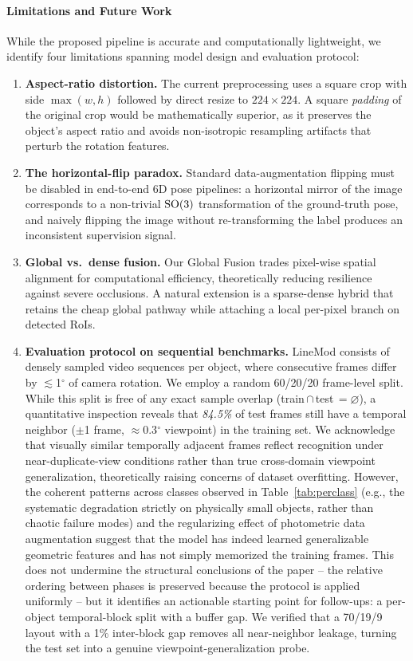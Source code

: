 \paragraph{Limitations and Future Work}
While the proposed pipeline is accurate and computationally lightweight, we identify four limitations spanning model design and evaluation protocol:
\begin{enumerate}
    \item \textbf{Aspect-ratio distortion.} The current preprocessing uses a square crop with side $\max(w,h)$ followed by direct resize to $224{\times}224$. A square \emph{padding} of the original crop would be mathematically superior, as it preserves the object's aspect ratio and avoids non-isotropic resampling artifacts that perturb the rotation features.
    \item \textbf{The horizontal-flip paradox.} Standard data-augmentation flipping must be disabled in end-to-end 6D pose pipelines: a horizontal mirror of the image corresponds to a non-trivial $\mathrm{SO}(3)$ transformation of the ground-truth pose, and naively flipping the image without re-transforming the label produces an inconsistent supervision signal.
    \item \textbf{Global vs.\ dense fusion.} Our Global Fusion trades pixel-wise spatial alignment for computational efficiency, theoretically reducing resilience against severe occlusions. A natural extension is a sparse-dense hybrid that retains the cheap global pathway while attaching a local per-pixel branch on detected RoIs.
    \item \textbf{Evaluation protocol on sequential benchmarks.} LineMod consists of densely sampled video sequences per object, where consecutive frames differ by $\lesssim$1$^\circ$ of camera rotation. We employ a random 60/20/20 frame-level split. While this split is free of any exact sample overlap (train\,$\cap$\,test\,$=\varnothing$), a quantitative inspection reveals that \emph{84.5\%} of test frames still have a temporal neighbor ($\pm$1 frame, $\approx$0.3$^\circ$ viewpoint) in the training set. We acknowledge that visually similar temporally adjacent frames reflect recognition under near-duplicate-view conditions rather than true cross-domain viewpoint generalization, theoretically raising concerns of dataset overfitting. However, the coherent patterns across classes observed in Table~\ref{tab:perclass} (e.g., the systematic degradation strictly on physically small objects, rather than chaotic failure modes) and the regularizing effect of photometric data augmentation suggest that the model has indeed learned generalizable geometric features and has not simply memorized the training frames. This does not undermine the structural conclusions of the paper -- the relative ordering between phases is preserved because the protocol is applied uniformly -- but it identifies an actionable starting point for follow-ups: a per-object temporal-block split with a buffer gap. We verified that a 70/19/9 layout with a 1\% inter-block gap removes all near-neighbor leakage, turning the test set into a genuine viewpoint-generalization probe.
\end{enumerate}

